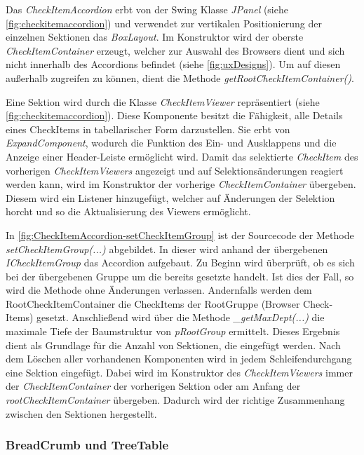 Das \emph{CheckItemAccordion} erbt von der Swing Klasse \emph{JPanel} (siehe \autoref{fig:checkitemaccordion}) und verwendet zur vertikalen Positionierung der einzelnen Sektionen das \emph{BoxLayout}. Im Konstruktor wird der oberste \emph{CheckItemContainer} erzeugt, welcher zur Auswahl des Browsers dient und sich nicht innerhalb des Accordions befindet (siehe \autoref{fig:uxDesigns}). Um auf diesen außerhalb zugreifen zu können, dient die Methode \emph{getRootCheckItemContainer()}.

Eine Sektion wird durch die Klasse \emph{CheckItemViewer} repräsentiert (siehe \autoref{fig:checkitemaccordion}). Diese Komponente besitzt die Fähigkeit, alle Details eines CheckItems in tabellarischer Form darzustellen. Sie erbt von \emph{ExpandComponent}, wodurch die Funktion des Ein- und Ausklappens und die Anzeige einer Header-Leiste ermöglicht wird. Damit das selektierte \emph{CheckItem} des vorherigen \emph{CheckItemViewers} angezeigt und auf Selektionsänderungen reagiert werden kann, wird im Konstruktor der vorherige \emph{CheckItemContainer} übergeben. Diesem wird ein Listener hinzugefügt, welcher auf Änderungen der Selektion horcht und so die Aktualisierung des Viewers ermöglicht.



In \autoref{fig:CheckItemAccordion-setCheckItemGroup} ist der Sourcecode der Methode \emph{setCheckItemGroup(...)} abgebildet. In dieser wird anhand der übergebenen \emph{ICheckItemGroup} das Accordion aufgebaut. Zu Beginn wird überprüft, ob es sich bei der übergebenen Gruppe um die bereits gesetzte handelt. Ist dies der Fall, so wird die Methode ohne Änderungen verlassen. Andernfalls werden dem RootCheckItemContainer die CheckItems der RootGruppe (Browser Check-Items) gesetzt. Anschließend wird über die Methode \emph{\_getMaxDept(...)} die maximale Tiefe der Baumstruktur von \emph{pRootGroup} ermittelt. Dieses Ergebnis dient als Grundlage für die Anzahl von Sektionen, die eingefügt werden. Nach dem Löschen aller vorhandenen Komponenten wird in jedem Schleifendurchgang eine Sektion eingefügt. Dabei wird im Konstruktor des \emph{CheckItemViewers} immer der \emph{CheckItemContainer} der vorherigen Sektion oder am Anfang der \emph{rootCheckItemContainer} übergeben. Dadurch wird der richtige Zusammenhang zwischen den Sektionen hergestellt.

\subsubsection{BreadCrumb und TreeTable}


